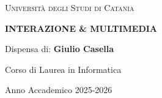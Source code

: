 \begin{titlepage}
    \centering
    {\scshape\LARGE Università degli Studi di Catania \par}
    \vspace{1.5cm}
    {\huge\bfseries INTERAZIONE \& MULTIMEDIA \par}
    \vspace{1cm}
    \vspace{1cm}
    {\Large Dispensa di: \textbf{Giulio Casella} \par}
    \vfill
    Corso di Laurea in Informatica\par
    Anno Accademico 2025-2026
\end{titlepage}